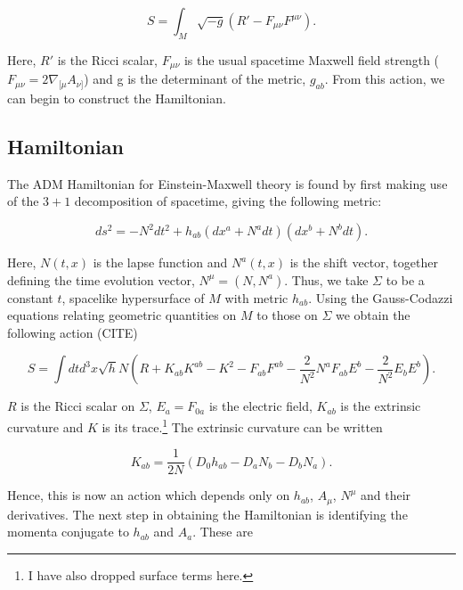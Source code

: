 \documentclass[titlepage]{article}
\def\beq{\begin{equation}}
\def\eeq{\end{equation}}
\begin{document}
\beq
S = \int_M \sqrt{-g}\left(R'-F_{\mu\nu}F^{\mu\nu}\right).
\eeq

\noindent
Here, $R'$ is the Ricci scalar, $F_{\mu\nu}$ is the usual spacetime Maxwell field strength ($F_{\mu\nu} = 2 \nabla_{[\mu}A_{\nu]}$) and g is the determinant of the metric, $g_{ab}$.  From this action, we can begin to construct the Hamiltonian.






\subsection{Hamiltonian}

The ADM Hamiltonian for Einstein-Maxwell theory is found by first making use of the $3+1$ decomposition of spacetime, giving the following metric:

\beq
ds^2=-N^2dt^2 + h_{ab}\left(dx^a+N^a dt\right)\left(dx^b+N^b dt\right).
\eeq

\noindent
Here, $N(t,x)$ is the lapse function and $N^a(t,x)$ is the shift vector, together defining the time evolution vector, $N^\mu=(N,N^a)$. Thus, we take $\Sigma$ to be a constant $t$, spacelike hypersurface of $M$ with metric $h_{ab}$.  Using the Gauss-Codazzi equations relating geometric quantities on $M$ to those on $\Sigma$ we obtain the following action (CITE)

\beq
S=\int dt d^3x \sqrt{h} N \left(R+K_{ab}K^{ab}-K^2 - F_{ab}F^{ab}- \frac{2}{N^{2}} N^a F_{ab}E^b - \frac{2}{N^{2}} E_b E^b \right).
\eeq


\noindent
$R$ is the Ricci scalar on $\Sigma$, $E_a = F_{0a}$ is the electric field, $K_{ab}$ is the extrinsic curvature and $K$ is its trace.\footnote{I have also dropped surface terms here.}  The extrinsic curvature can be written

\beq
K_{ab}= \frac{1}{2N}\left(D_0 h_{ab}-D_aN_b-D_bN_a\right).
\eeq

\noindent
Hence, this is now an action which depends only on $h_{ab}$, $A_\mu$, $N^\mu$ and their derivatives.  The next step in obtaining the Hamiltonian is identifying the momenta conjugate to $h_{ab}$ and $A_a$.  These are
\end{document}
